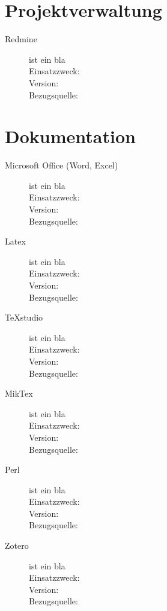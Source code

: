 \section{Projektverwaltung}

\begin{description}
	\item [Redmine] ist ein bla \\
	Einsatzzweck: \\
	Version: \\
	Bezugsquelle: \\
\end{description}


\section{Dokumentation}

\begin{description}
	\item [Microsoft Office (Word, Excel)] ist ein bla \\
	Einsatzzweck: \\
	Version: \\
	Bezugsquelle: \\
	
	
	\item [Latex] ist ein bla \\
	Einsatzzweck: \\
	Version: \\
	Bezugsquelle: \\
	
	
	\item [TeXstudio] ist ein bla \\
	Einsatzzweck: \\
	Version: \\
	Bezugsquelle: \\
	
	
	\item [MikTex] ist ein bla \\
	Einsatzzweck: \\
	Version: \\
	Bezugsquelle: \\
	
	
	\item [Perl] ist ein bla \\
	Einsatzzweck: \\
	Version: \\
	Bezugsquelle: \\
	
	
	\item [Zotero] ist ein bla \\
	Einsatzzweck: \\
	Version: \\
	Bezugsquelle: \\
\end{description}



